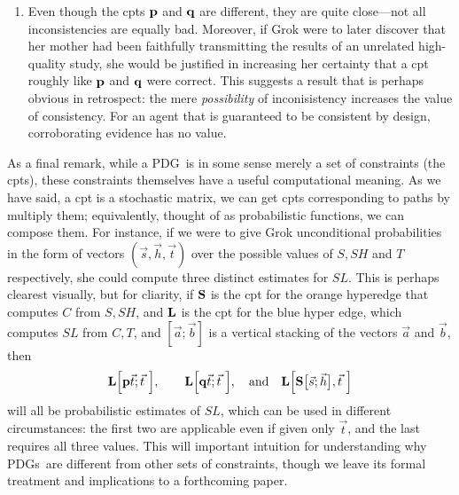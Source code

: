 \documentclass{article}
\newcommand{\MN}{PDG}
\newcommand{\MNs}{\MN s}
\numberwithin{equation}{section}
\begin{document}
\begin{example}
\begin{enumerate}[itemsep=0.2em, leftmargin=7pt]
				\label{feat:no-magic-please}
			\item Even though the cpts $\mathbf p$ and $\mathbf q$ are different, they are quite close---not all inconsistencies are equally bad.  Moreover, if Grok were to later discover that her mother had been faithfully transmitting the results of an unrelated high-quality study, she would be justified in increasing her certainty that a cpt roughly like $\mathbf p$ and $\mathbf q$ were correct. 
			This suggests a result that is perhaps obvious in retrospect: the mere \emph{possibility} of inconisistency increases the value of consistency. For an agent that is guaranteed to be consistent by design, corroborating evidence has no value. 
				\label{feat:corrob}
		\end{enumerate}
		As a final remark, while a \MN\ is in some sense merely a set of constraints (the cpts), these constraints themselves have a useful computational meaning. As we have said, a cpt is a stochastic matrix, we can get cpts corresponding to paths by multiply them; equivalently, thought of as probabilistic functions, we can compose them.
		For instance, if we were to give Grok unconditional probabilities in the form of vectors $(\vec s, \vec h, \vec t)$ over the possible values of $\mathit{S, SH}$ and $\mathit T$ respectively, she could compute three distinct estimates for $\mathit{SL}$. This is perhaps clearest visually, but for cliarity, if $\mathbf S$ is the cpt for the orange hyperedge that computes $C$ from $\mathit{S, SH}$, and $\mathbf L$ is the cpt for the blue hyper edge, which computes $\mathit{SL}$ from $\mathit{C, T}$, and $[\vec a; \vec b]$ is a vertical stacking of the vectors $\vec a$ and $\vec b$, then
		\[ \mat L \Big[\mat p \vec t; \vec t\ \Big],
		 	\qquad \mat L \Big[\mat q \vec t; \vec t\ \Big], \quad\text{and}
			\quad \mat L \Big[\mat S \big[\vec s; \vec h\big], \vec t\ \Big]  \]
		will all be probabilistic estimates of $\mathit{SL}$, which can be used in different circumstances: the first two are applicable even if given only $\vec t$, and the last requires all three values.
		This will important intuition for understanding why \MNs\ are different from other sets of constraints, though we leave its formal treatment and implications to a forthcoming paper.
	\end{example}
\end{document}
